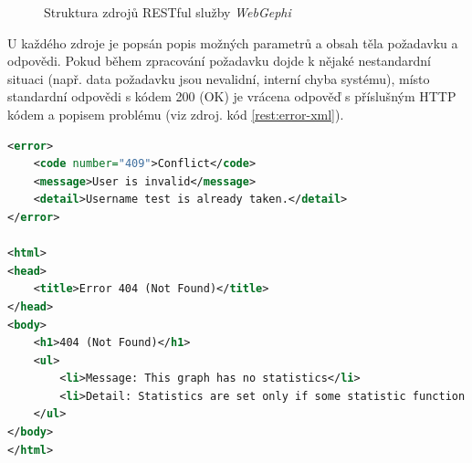 \documentclass[thesis=M,czech]{FITthesis}[2014/05/6]
\begin{document}
\begin{figure}
	\caption[Struktura zdrojů RESTful služby \textit{WebGephi}]{Struktura zdrojů RESTful služby \textit{WebGephi}}\label{fig:webgephi-restful}
\end{figure}

U každého zdroje je popsán popis možných parametrů a obsah těla požadavku a odpovědi. Pokud během zpracování požadavku
dojde k nějaké nestandardní situaci (např. data požadavku jsou nevalidní, interní chyba systému), místo standardní 
odpovědi s kódem 200 (OK) je vrácena odpověď s příslušným HTTP kódem a popisem problému (viz zdroj. kód \ref{rest:error-xml}).

\begin{lstlisting}[caption=XML a HTML chybová odpověď, label=rest:error-xml, language=xml]
<error>
    <code number="409">Conflict</code>
    <message>User is invalid</message>
    <detail>Username test is already taken.</detail>
</error>

<html>
<head>
    <title>Error 404 (Not Found)</title>
</head>
<body>
    <h1>404 (Not Found)</h1>
    <ul>
        <li>Message: This graph has no statistics</li>
        <li>Detail: Statistics are set only if some statistic function was applied previously</li>
    </ul>
</body>
</html>
\end{lstlisting}
\end{document}
